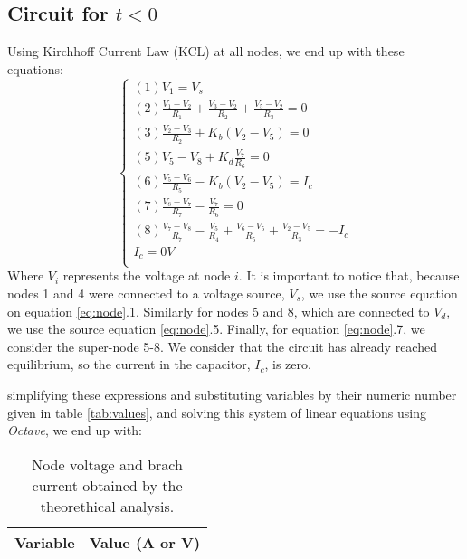 \subsection{Circuit for $t<0$}
Using Kirchhoff Current Law (KCL) at all nodes, we end up with these equations:
\begin{equation}\label{eq:node}
  \begin{cases}
    (1) V_1 = V_s \\
    (2) \frac{V_1 - V_2}{R_1} + \frac{V_3 - V_2}{R_2} + \frac{V_5 - V_2}{R_3} = 0 \\
    (3) \frac{V_2 - V_3}{R_2} + K_b(V_2 - V_5) = 0 \\
    (5) V_5 - V_8 + K_d\frac{V_7}{R_6} = 0 \\
    (6) \frac{V_5 - V_6}{R_5} - K_b(V_2-V_5) = I_c \\
    (7) \frac{V_8 - V_7}{R_7} - \frac{V_7}{R_6} = 0 \\
    (8) \frac{V_7 - V_8}{R_7} - \frac{V_5}{R_4} + \frac{V_6 - V_5}{R_5} + \frac{V_2 - V_5}{R_3} = -I_c \\
    I_c = 0V \\
  \end{cases}
\end{equation}
Where $V_i$ represents the voltage at node $i$. It is important to notice that, because nodes 1 and 4 were connected to a voltage source, $V_s$, we use the source equation on equation \ref{eq:node}.1. Similarly for nodes 5 and 8, which are connected to $V_d$, we use the source equation \ref{eq:node}.5. Finally, for equation \ref{eq:node}.7, we consider the super-node 5-8. We consider that the circuit has already reached equilibrium, so the current in the capacitor, $I_c$, is zero.
\par
simplifying these expressions and substituting variables by their numeric number given in table \ref{tab:values}, and solving this system of linear equations using \textit{Octave}, we end up with:
\begin{table}[H]
  \centering
  \begin{tabular}{|l|r|}
    \hline    
    {\bf Variable} & {\bf Value (A or V)} \\ \hline
    
  \end{tabular}
  \caption{Node voltage and brach current obtained by the theorethical analysis.}
  \label{tab:node}
\end{table}
\par

